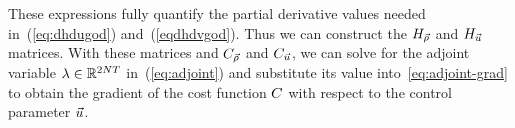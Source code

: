 These expressions fully quantify the partial derivative values needed
in~(\ref{eq:dhdugod}) and~(\ref{eqdhdvgod}). Thus we can construct
the $H_{\vec{\rho}}$ and $H_{\vec{u}}$ matrices. With these matrices and $C_{\vec{\rho}}$ and
$C_{\vec{u}}$, we can solve for the adjoint variable $\lambda\in\mathbb{R}^{2NT}$
in~(\ref{eq:adjoint}) and substitute its value into~\ref{eq:adjoint-grad}
to obtain the gradient of the cost function $C$ with respect
to the control parameter $\vec{u}$.
